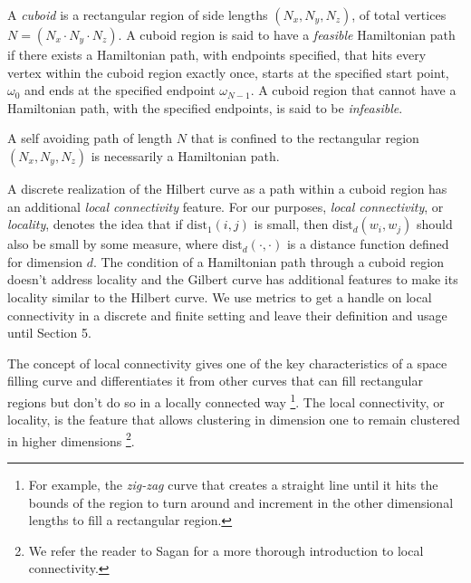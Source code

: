 A \textit{cuboid} is a rectangular region of side lengths $( N _ x, N _ y, N _ z)$,  of total vertices $N = (N _ x \cdot N _ y \cdot N _ z)$.
A cuboid region is said to have a \textit{feasible} Hamiltonian path if there exists a Hamiltonian path, with endpoints specified,
that hits every vertex within the cuboid region exactly once, starts at the specified start
point, $\omega_0$ and ends at the specified endpoint $\omega_{N-1}$.
A cuboid region that cannot have a Hamiltonian path, with the specified endpoints, is said to be \textit{infeasible}.

A self avoiding path of length $N$ that is confined to the rectangular region $(N_x, N_y, N_z)$ is necessarily a Hamiltonian path.

A discrete realization of the Hilbert curve as a path within a cuboid region has an additional \textit{local connectivity} feature.
For our purposes, \textit{local connectivity}, or \textit{locality}, denotes the idea that if $\text{dist}_1(i,j)$ is small, then $\text{dist}_d(w_i,w_j)$
should also be small by some measure, where $\text{dist}_d(\cdot,\cdot)$ is a distance function defined for dimension $d$.
The condition of a Hamiltonian path through a cuboid region doesn't address locality and the Gilbert curve
has additional features to make its locality similar to the Hilbert curve.
We use metrics to get a handle on local connectivity in a discrete and finite setting and leave
their definition and usage until Section 5.



The concept of local connectivity gives one of the key characteristics of a space filling curve
and differentiates it from other curves that can fill rectangular regions but don't do so in a
locally connected way \footnote{For example, the \textit{zig-zag} curve that creates a straight line until
it hits the bounds of the region to turn around and increment in the other dimensional lengths to fill 
a rectangular region.}.
The local connectivity, or locality, is the feature that allows clustering in dimension one to
remain clustered in higher dimensions \footnote{We refer the reader to
Sagan \cite{sagan_1994} for a more thorough introduction to local connectivity.}.

